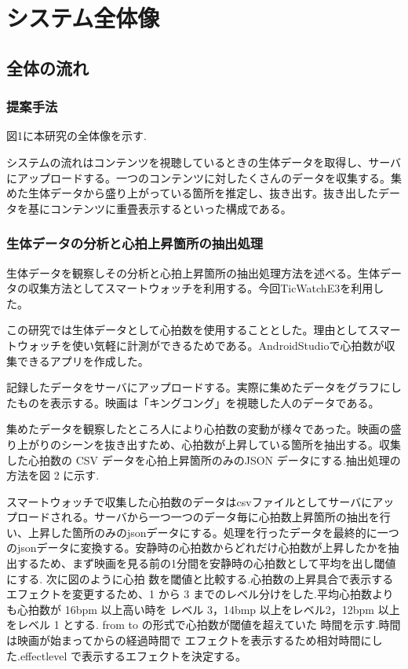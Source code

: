 \chapter{システム全体像}
\thispagestyle{myheadings}

\section{全体の流れ}

\subsection{提案手法}
図1に本研究の全体像を示す.

システムの流れはコンテンツを視聴しているときの生体データを取得し、サーバにアップロードする。一つのコンテンツに対したくさんのデータを収集する。集めた生体データから盛り上がっている箇所を推定し、抜き出す。抜き出したデータを基にコンテンツに重畳表示するといった構成である。


\subsection{生体データの分析と心拍上昇箇所の抽出処理}
生体データを観察しその分析と心拍上昇箇所の抽出処理方法を述べる。生体データの収集方法としてスマートウォッチを利用する。今回TicWatchE3を利用した。

この研究では生体データとして心拍数を使用することとした。理由としてスマートウォッチを使い気軽に計測ができるためである。AndroidStudioで心拍数が収集できるアプリを作成した。


記録したデータをサーバにアップロードする。実際に集めたデータをグラフにしたものを表示する。映画は「キングコング」を視聴した人のデータである。


集めたデータを観察したところ人により心拍数の変動が様々であった。映画の盛り上がりのシーンを抜き出すため、心拍数が上昇している箇所を抽出する。収集した心拍数の CSV データを心拍上昇箇所のみのJSON データにする.抽出処理の方法を図 2 に示す.

スマートウォッチで収集した心拍数のデータはcsvファイルとしてサーバにアップロードされる。サーバから一つ一つのデータ毎に心拍数上昇箇所の抽出を行い、上昇した箇所のみのjsonデータにする。処理を行ったデータを最終的に一つのjsonデータに変換する。安静時の心拍数からどれだけ心拍数が上昇したかを抽出するため、まず映画を見る前の1分間を安静時の心拍数として平均を出し閾値にする. 次に図のように心拍 数を閾値と比較する.心拍数の上昇具合で表示するエフェクトを変更するため、1 から 3 までのレベル分けをした.平均心拍数よりも心拍数が 16bpm 以上高い時を レベル 3，14bmp 以上をレベル2，12bpm 以上をレベル 1 とする. from to の形式で心拍数が閾値を超えていた 時間を示す.時間は映画が始まってからの経過時間で エフェクトを表示するため相対時間にした.effectlevel で表示するエフェクトを決定する。

